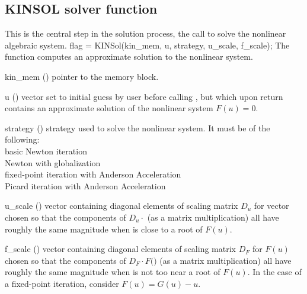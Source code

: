 \subsection{KINSOL solver function}\label{sss:kinsol}

This is the central step in the solution process, the call to solve
the nonlinear algebraic system.
%
{
  flag = KINSol(kin\_mem, u, strategy, u\_scale, f\_scale);
}
{
  The function  computes an approximate solution to the nonlinear
  system.
}
{
  \begin{args}[strategy]
  \item[kin\_mem] ()
    pointer to the {\kinsol} memory block.
  \item[u] ()
    vector set to initial guess by user before calling ,
    but which upon return contains an approximate solution of
    the nonlinear system $F(u) = 0$.
  \item[strategy] ()
    strategy used to solve the nonlinear system. It must be of the following: \\
      basic Newton iteration \\
     Newton with globalization \\
     fixed-point iteration with Anderson Acceleration \\
     Picard iteration with Anderson Acceleration \\
  \item[u\_scale] ()
    vector containing diagonal elements of scaling matrix $D_u$ for vector 
    chosen so that the components of $D_u \cdot$
    (as a matrix multiplication) all have roughly the same magnitude when 
     is close to a root of $F(u)$.
  \item[f\_scale] ()
    vector containing diagonal elements of scaling matrix $D_F$ for $F(u)$ chosen 
    so that the components of $D_F \cdot F($$)$ 
    (as a matrix multiplication) all have roughly the same magnitude when 
     is not too near a root of $F(u)$. In the case of a fixed-point
    iteration, consider $F(u) = G(u) - u$.
  \end{args}
}
